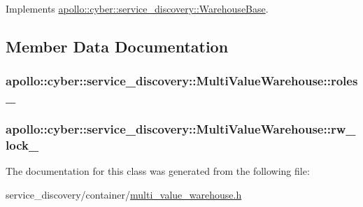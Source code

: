 Implements \hyperlink{classapollo_1_1cyber_1_1service__discovery_1_1WarehouseBase_ac7af8481d1770471effacbf7b7dd0b64}{apollo\-::cyber\-::service\-\_\-discovery\-::\-Warehouse\-Base}.



\subsection{Member Data Documentation}
\hypertarget{classapollo_1_1cyber_1_1service__discovery_1_1MultiValueWarehouse_a8c064f1d708e8c0b905454df8efbf00c}{
\subsubsection[{roles\-\_\-}]{ apollo\-::cyber\-::service\-\_\-discovery\-::\-Multi\-Value\-Warehouse\-::roles\-\_\-\hspace{0.3cm}{\ttfamily [private]}}}\label{classapollo_1_1cyber_1_1service__discovery_1_1MultiValueWarehouse_a8c064f1d708e8c0b905454df8efbf00c}
\hypertarget{classapollo_1_1cyber_1_1service__discovery_1_1MultiValueWarehouse_a0b5aad2758df1db3e170337b9775abb6}{
\subsubsection[{rw\-\_\-lock\-\_\-}]{ apollo\-::cyber\-::service\-\_\-discovery\-::\-Multi\-Value\-Warehouse\-::rw\-\_\-lock\-\_\-\hspace{0.3cm}{\ttfamily [private]}}}\label{classapollo_1_1cyber_1_1service__discovery_1_1MultiValueWarehouse_a0b5aad2758df1db3e170337b9775abb6}


The documentation for this class was generated from the following file\-:\begin{DoxyCompactItemize}
\item 
service\-\_\-discovery/container/\hyperlink{multi__value__warehouse_8h}{multi\-\_\-value\-\_\-warehouse.\-h}\end{DoxyCompactItemize}
